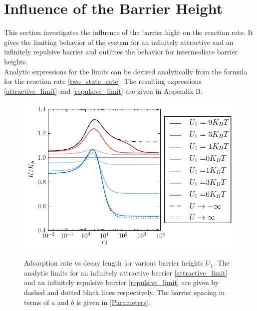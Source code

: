 \section{Influence of the Barrier Height}
This section investigates the influence of the barrier hight on the reaction rate. It gives the limiting behavior of the system for an infinitely attractive and an infinitely repulsive barrier and outlines the behavior for intermediate barrier heights.\\
Analytic expressions for the limits can be derived analytically from the formula for the reaction rate \eqref{two_state_rate}. The resulting expressions \eqref{attractive_limit} and \eqref{repulsive_limit} are given in Appendix B.

\begin{minipage}[t]{.64 \textwidth}
\begin{figure}[H]
    \centering
    \includegraphics[width = 1 \textwidth]{plots/u1_dependence}
\end{figure}
\end{minipage} \hspace{0.01 \textwidth} \begin{minipage}[t]{.35 \textwidth}
    \begin{figure}[H]
        \caption{Adsorption rate vs decay length for various barrier heights $U_1$. The analytic limits for an infinitely attractive barrier \eqref{attractive_limit} and an infinitely repulsive barrier \eqref{repulsive_limit} are given by dashed and dotted black lines respectively. The barrier spacing in terms of $a$ and $b$ is given in \ref{Parameters}. \label{u1_dependence}}
    \end{figure}
\end{minipage}

